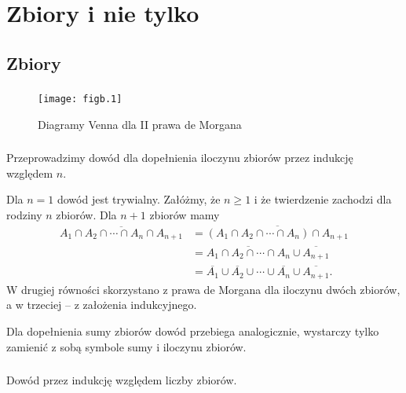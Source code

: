 \chapter{Zbiory i nie tylko}

\section{Zbiory}

\subsection{} %
\begin{figure}[!h]
	\begin{center}
		\texttt{[image: figb.1]}
	\end{center}
	\caption{Diagramy Venna dla II prawa de Morgana}
\end{figure}

\subsection{} %
Przeprowadzimy dowód dla dopełnienia iloczynu zbiorów przez indukcję względem $n$.

Dla $n=1$ dowód jest trywialny. Załóżmy, że $n\ge1$ i że twierdzenie zachodzi dla rodziny $n$ zbiorów. Dla $n+1$ zbiorów mamy
\begin{align*}
	\overline{A_1\cap A_2\cap\cdots\cap A_n\cap A_{n+1}} &= \overline{(A_1\cap A_2\cap\cdots\cap A_n)\cap A_{n+1}} \\
	&= \overline{A_1\cap A_2\cap\cdots\cap A_n}\cup\overline{A_{n+1}} \\
	&= \overline{A_1}\cup\overline{A_2}\cup\cdots\cup\overline{A_n}\cup\overline{A_{n+1}}.
\end{align*}
W drugiej równości skorzystano z prawa de Morgana dla iloczynu dwóch zbiorów, a w trzeciej -- z założenia indukcyjnego.

Dla dopełnienia sumy zbiorów dowód przebiega analogicznie, wystarczy tylko zamienić z sobą symbole sumy i iloczynu zbiorów.

\subsection{} %
Dowód przez indukcję względem liczby zbiorów.

